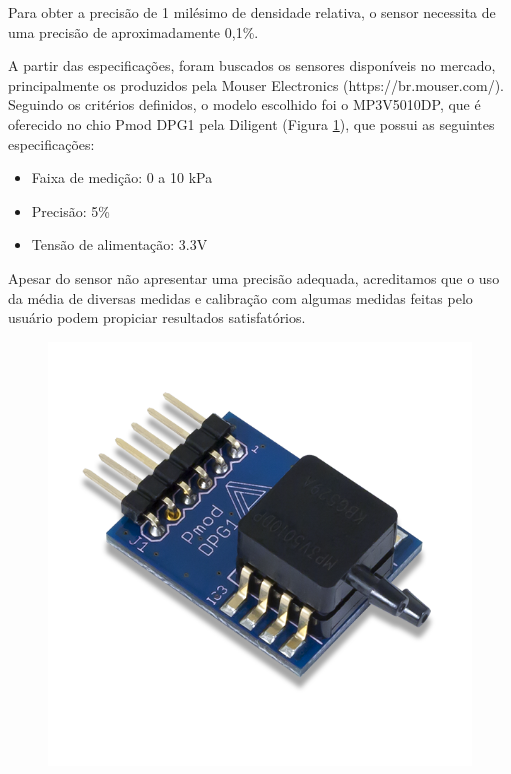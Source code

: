 Para obter a precisão de 1 milésimo de densidade relativa, o sensor necessita de uma precisão de aproximadamente 0,1\%.


A partir das especificações, foram buscados os sensores disponíveis no mercado, principalmente os produzidos pela Mouser Electronics (https://br.mouser.com/). Seguindo os critérios definidos, o modelo escolhido foi o MP3V5010DP, que é oferecido no chio Pmod DPG1 pela Diligent (Figura \ref{fig:Pmod_DPG1}), que possui as seguintes especificações:

\begin{itemize}
\item Faixa de medição: 0 a 10 kPa
\item Precisão: 5\%
\item Tensão de alimentação: 3.3V
\end{itemize}

Apesar do sensor não apresentar uma precisão adequada, acreditamos que o uso da média de diversas medidas e calibração com algumas medidas feitas pelo usuário podem propiciar resultados satisfatórios.

\begin{figure}[h]
    \centering
    \includegraphics[scale=0.25]{figuras/projeto/hardware/DPG1.png}
    \label{fig:Pmod_DPG1}
\end{figure}


